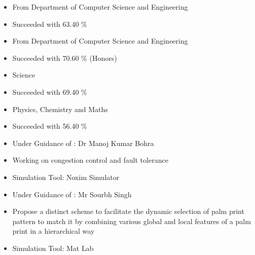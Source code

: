 \documentclass[10pt,a4paper,ragged2e,withhyper]{altacv}
\begin{document}
\begin{paracol}{2}
\divider

\begin{itemize}
\item From Department of Computer Science and Engineering
\item Succeeded with 63.40 \%
\end{itemize}

\divider

\begin{itemize}
\item From Department of Computer Science and Engineering
\item Succeeded with 70.60 \% (Honors)
\end{itemize}

\divider



\begin{itemize}
\item Science
\item Succeeded with 69.40 \%
\end{itemize}

\divider

\begin{itemize}
\item Physics, Chemistry and Maths
\item Succeeded with 56.40 \%
\end{itemize}


\divider


\begin{itemize}
\item Under Guidance of : Dr Manoj Kumar Bohra
\item Working on congestion control and fault tolerance
\item Simulation Tool: Noxim Simulator
\end{itemize}

\divider

\begin{itemize}
\item Under Guidance of : Mr Sourbh Singh
\item Propose a distinct scheme to facilitate the dynamic selection of palm print pattern to match it by combining various global and local features of a palm print in a hierarchical way
\item Simulation Tool: Mat Lab
\end{itemize}


\end{paracol}
\end{document}
